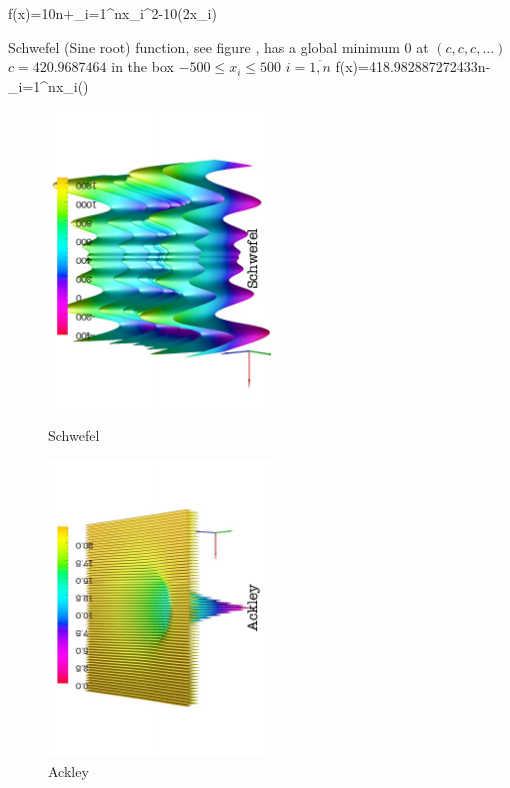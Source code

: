 \be
\label{rastriginf}
f(x)=10n+\sum_{i=1}^{n}x_i^2-10\cos(2\pi x_i)
\ee
%
\par{Schwefel (Sine root) function, see figure ,  has a global
minimum 0 at $(c,c,c,...)$ $c=420.9687464$ in the box
$-500\leq x_i \leq 500$ $i=\overline{1,n}$}
\be
\label{schwefelf}
f(x)=418.982887272433n-\sum_{i=1}^{n}x_i\sin()
\ee
\begin{figure}[!htb]
\begin{minipage}[!htb]{7.6cm}
\begin{center}
\includegraphics[width=5.9cm,angle=-90]{figures/schwefel}
\end{center}
\caption{Schwefel  }
\label{schwefel}
\end{minipage}
%
\begin{minipage}[!htb]{7.6cm}
\begin{center}
\includegraphics[width=5.9cm,angle=-90]{figures/ackley}
\end{center}
\caption{Ackley  }
\label{ackley}
\end{minipage}
\end{figure}

